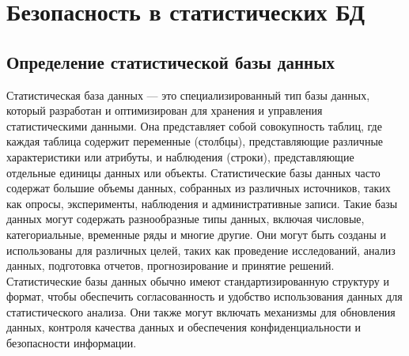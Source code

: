 \section{Безопасность в статистических БД}

\subsection{Определение статистической базы данных}

Статистическая база данных — это специализированный тип базы данных, который разработан и оптимизирован для хранения и управления статистическими данными. Она представляет собой совокупность таблиц, где каждая таблица содержит переменные (столбцы), представляющие различные характеристики или атрибуты, и наблюдения (строки), представляющие отдельные единицы данных или объекты. Статистические базы данных часто содержат большие объемы данных, собранных из различных источников, таких как опросы, эксперименты, наблюдения и административные записи. Такие базы данных могут содержать разнообразные типы данных, включая числовые, категориальные, временные ряды и многие другие. Они могут быть созданы и использованы для различных целей, таких как проведение исследований, анализ данных, подготовка отчетов, прогнозирование и принятие решений.
\\

Статистические базы данных обычно имеют стандартизированную структуру и формат, чтобы обеспечить согласованность и удобство использования данных для статистического анализа. Они также могут включать механизмы для обновления данных, контроля качества данных и обеспечения конфиденциальности и безопасности информации.
\\

